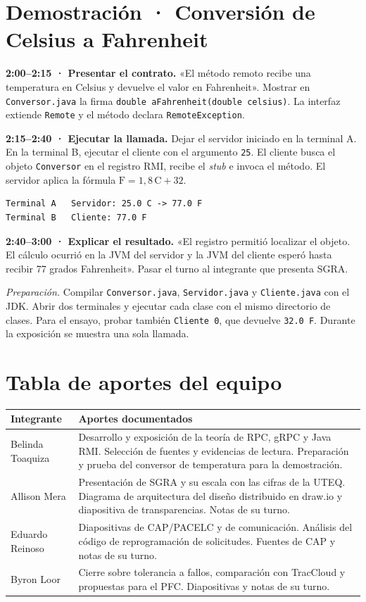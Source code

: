 \documentclass[10pt,a4paper]{article}
\begin{document}
\section*{Demostración · Conversión de Celsius a Fahrenheit}

\textbf{2:00--2:15 · Presentar el contrato.}
«El método remoto recibe una temperatura en Celsius y devuelve el valor en Fahrenheit». Mostrar en \texttt{Conversor.java} la firma \texttt{double aFahrenheit(double celsius)}. La interfaz extiende \texttt{Remote} y el método declara \texttt{RemoteException}.

\textbf{2:15--2:40 · Ejecutar la llamada.}
Dejar el servidor iniciado en la terminal A. En la terminal B, ejecutar el cliente con el argumento \texttt{25}. El cliente busca el objeto \texttt{Conversor} en el registro RMI, recibe el \emph{stub} e invoca el método. El servidor aplica la fórmula \(\mathrm{F} = 1{,}8\,\mathrm{C} + 32\).

\begin{verbatim}
Terminal A   Servidor: 25.0 C -> 77.0 F
Terminal B   Cliente: 77.0 F
\end{verbatim}

\textbf{2:40--3:00 · Explicar el resultado.}
«El registro permitió localizar el objeto. El cálculo ocurrió en la JVM del servidor y la JVM del cliente esperó hasta recibir 77 grados Fahrenheit». Pasar el turno al integrante que presenta SGRA.

\textit{Preparación.} Compilar \texttt{Conversor.java}, \texttt{Servidor.java} y \texttt{Cliente.java} con el JDK. Abrir dos terminales y ejecutar cada clase con el mismo directorio de clases. Para el ensayo, probar también \texttt{Cliente 0}, que devuelve \texttt{32.0 F}. Durante la exposición se muestra una sola llamada.

\section*{Tabla de aportes del equipo}

\begin{tabularx}{\linewidth}{@{}lX@{}}
  \toprule
  \textbf{Integrante} & \textbf{Aportes documentados}\\
  \midrule
  Belinda Toaquiza & Desarrollo y exposición de la teoría de RPC, gRPC y
  Java RMI. Selección de fuentes y evidencias de lectura. Preparación y prueba
  del conversor de temperatura para la demostración.\\
  Allison Mera & Presentación de SGRA y su escala con las cifras de la UTEQ. Diagrama de arquitectura del diseño distribuido en draw.io y diapositiva de transparencias. Notas de su turno.\rule{0pt}{5mm}\\
  Eduardo Reinoso & Diapositivas de CAP/PACELC y de comunicación. Análisis del código de reprogramación de solicitudes. Fuentes de CAP y notas de su turno.\rule{0pt}{5mm}\\
  Byron Loor & Cierre sobre tolerancia a fallos, comparación con TracCloud y propuestas para el PFC. Diapositivas y notas de su turno.\rule{0pt}{5mm}\\
  \bottomrule
\end{tabularx}
\end{document}
